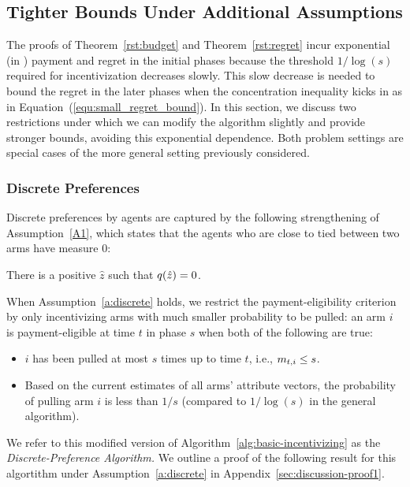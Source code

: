 \subsection{Tighter Bounds Under Additional Assumptions}

The proofs of Theorem~\ref{rst:budget} and Theorem~\ref{rst:regret}
incur exponential (in \ARMNUM) payment and regret in the initial
phases because the threshold $1/\log(s)$ required for incentivization
decreases slowly. 
This slow decrease is needed to bound the regret in the later phases
when the concentration inequality kicks in as in
Equation~(\ref{equ:small_regret_bound}).
In this section, we discuss two restrictions under which we can
modify the algorithm slightly and provide stronger bounds,
avoiding this exponential dependence.
Both problem settings are special cases of the more general
setting previously considered. 

\subsubsection{Discrete Preferences}
\label{subsec:discrete}
Discrete preferences by agents are captured by the following
strengthening of Assumption~\ref{A1},
which states that the agents who are close to tied between
two arms have measure 0:

\begin{assumption}
\label{a:discrete}
There is a positive $\hat{z}$ such that
$q(\hat{z}) = 0$.
\end{assumption}

When Assumption~\ref{a:discrete} holds,
we restrict the payment-eligibility criterion by only incentivizing
arms with much smaller probability to be pulled:
an arm $i$ is payment-eligible at time $t$ in phase $s$ when both of
the following are true: 

\begin{itemize}
\item $i$ has been pulled at most $s$ times up to time $t$,
i.e., $m_{t,i} \leq s$.
\item Based on the current estimates  of all arms' attribute vectors,
the probability of pulling arm $i$ is less than $1/s$
(compared to $1/\log(s)$ in the general algorithm).
\end{itemize}

We refer to this modified version of
Algorithm~\ref{alg:basic-incentivizing} as the
\emph{Discrete-Preference Algorithm.}
We outline a proof of the following result for this algortithm under
Assumption~\ref{a:discrete} in Appendix~\ref{sec:discussion-proof1}.

